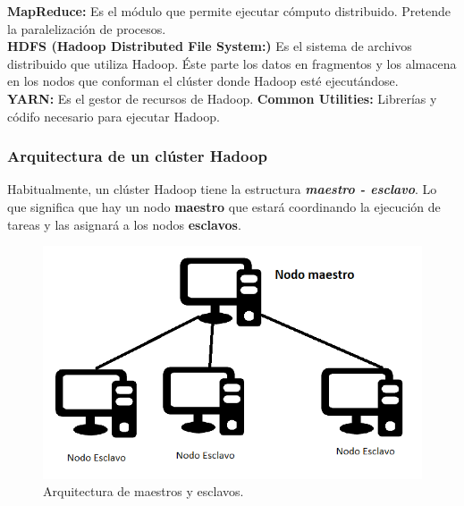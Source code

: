 \begin{UClist}
	\UCli \textbf{MapReduce:} Es el módulo que permite ejecutar cómputo distribuido. Pretende la paralelización de procesos.\\
	\UCli \textbf{HDFS (Hadoop Distributed File System:)} Es el sistema de archivos distribuido que utiliza Hadoop. Éste parte los datos en fragmentos y los almacena en los nodos que conforman el clúster donde Hadoop esté ejecutándose.\\
	\UCli \textbf{YARN:} Es el gestor de recursos de Hadoop.
	\UCli \textbf{Common Utilities:} Librerías y códifo necesario para ejecutar Hadoop.\\
\end{UClist}

\newpage
\subsubsection{Arquitectura de un clúster Hadoop}
Habitualmente, un clúster Hadoop tiene la estructura \textbf{\emph{maestro - esclavo}}. Lo que significa que hay un nodo \textbf{maestro} que estará coordinando la ejecución de tareas y las asignará a los nodos \textbf{esclavos}.\\

\begin{figure}[H]
	\begin{center}
		\hypertarget{fig:arquitecturaMaestroEsclavo}{\hspace{1pt}}
		\includegraphics{capitulo2/images/arquitecturaMaestroEsclavo.png}
		\caption{Arquitectura de maestros y esclavos.}
		\label{fig:arquitecturaMaestroEsclavo}
	\end{center}
\end{figure}

